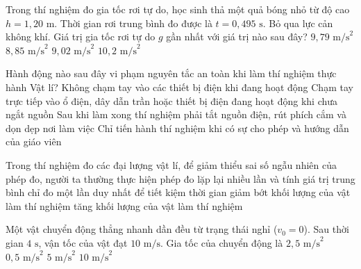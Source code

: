 \begin{ex}
	Trong thí nghiệm đo gia tốc rơi tự do, học sinh thả một quả bóng nhỏ từ độ cao $h = 1{,}20\text{ m}$. Thời gian rơi trung bình đo được là $t = 0{,}495\text{ s}$. Bỏ qua lực cản không khí. Giá trị gia tốc rơi tự do $g$ gần nhất với giá trị nào sau đây?
	\choice
	{\True $9{,}79\text{ m/s}^2$}
	{$8{,}85\text{ m/s}^2$}
	{$9{,}02\text{ m/s}^2$}
	{$10{,}2\text{ m/s}^2$}
\end{ex}

\begin{ex}
	Hành động nào sau đây vi phạm nguyên tắc an toàn khi làm thí nghiệm thực hành Vật lí?
	\choice
	{Không chạm tay vào các thiết bị điện khi đang hoạt động}
	{\True Chạm tay trực tiếp vào ổ điện, dây dẫn trần hoặc thiết bị điện đang hoạt động khi chưa ngắt nguồn}
	{Sau khi làm xong thí nghiệm phải tắt nguồn điện, rút phích cắm và dọn dẹp nơi làm việc}
	{Chỉ tiến hành thí nghiệm khi có sự cho phép và hướng dẫn của giáo viên}
\end{ex}

\begin{ex}
	Trong thí nghiệm đo các đại lượng vật lí, để giảm thiểu sai số ngẫu nhiên của phép đo, người ta thường
	\choice
	{\True thực hiện phép đo lặp lại nhiều lần và tính giá trị trung bình}
	{chỉ đo một lần duy nhất để tiết kiệm thời gian}
	{giảm bớt khối lượng của vật làm thí nghiệm}
	{tăng khối lượng của vật làm thí nghiệm}
\end{ex}

\begin{ex}
	Một vật chuyển động thẳng nhanh dần đều từ trạng thái nghỉ ($v_0 = 0$). Sau thời gian $4\text{ s}$, vận tốc của vật đạt $10\text{ m/s}$. Gia tốc của chuyển động là
	\choice
	{\True $2{,}5\text{ m/s}^2$}
	{$0{,}5\text{ m/s}^2$}
	{$5\text{ m/s}^2$}
	{$10\text{ m/s}^2$}
\end{ex}

